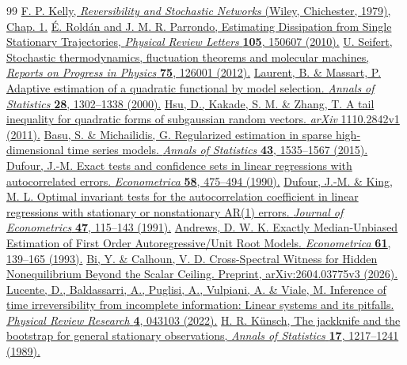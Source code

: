 \begin{thebibliography}{99}
 \href{https://www.statslab.cam.ac.uk/~fpk1/rsn.html}{F. P. Kelly, \emph{Reversibility and Stochastic Networks} (Wiley, Chichester, 1979), Chap. 1.}
 \href{https://doi.org/10.1103/PhysRevLett.105.150607}{\'{E}. Rold\'{a}n and J. M. R. Parrondo, Estimating Dissipation from Single Stationary Trajectories, \emph{Physical Review Letters} \textbf{105}, 150607 (2010).}
 \href{https://doi.org/10.1088/0034-4885/75/12/126001}{U. Seifert, Stochastic thermodynamics, fluctuation theorems and molecular machines, \emph{Reports on Progress in Physics} \textbf{75}, 126001 (2012).}
 \href{https://doi.org/10.1214/aos/1015957395}{Laurent, B. \& Massart, P. Adaptive estimation of a quadratic functional by model selection. \emph{Annals of Statistics} \textbf{28}, 1302--1338 (2000).}
 \href{https://arxiv.org/abs/1110.2842}{Hsu, D., Kakade, S. M. \& Zhang, T. A tail inequality for quadratic forms of subgaussian random vectors. \emph{arXiv} 1110.2842v1 (2011).}
 \href{https://doi.org/10.1214/15-AOS1315}{Basu, S. \& Michailidis, G. Regularized estimation in sparse high-dimensional time series models. \emph{Annals of Statistics} \textbf{43}, 1535--1567 (2015).}
 \href{https://doi.org/10.2307/2938212}{Dufour, J.-M. Exact tests and confidence sets in linear regressions with autocorrelated errors. \emph{Econometrica} \textbf{58}, 475--494 (1990).}
 \href{https://doi.org/10.1016/0304-4076(91)90080-W}{Dufour, J.-M. \& King, M. L. Optimal invariant tests for the autocorrelation coefficient in linear regressions with stationary or nonstationary AR(1) errors. \emph{Journal of Econometrics} \textbf{47}, 115--143 (1991).}
 \href{https://doi.org/10.2307/2951781}{Andrews, D. W. K. Exactly Median-Unbiased Estimation of First Order Autoregressive/Unit Root Models. \emph{Econometrica} \textbf{61}, 139--165 (1993).}
 \href{https://arxiv.org/abs/2604.03775v3}{Bi, Y. \& Calhoun, V. D. Cross-Spectral Witness for Hidden Nonequilibrium Beyond the Scalar Ceiling. Preprint, arXiv:2604.03775v3 (2026).}
 \href{https://doi.org/10.1103/PhysRevResearch.4.043103}{Lucente, D., Baldassarri, A., Puglisi, A., Vulpiani, A. \& Viale, M. Inference of time irreversibility from incomplete information: Linear systems and its pitfalls. \emph{Physical Review Research} \textbf{4}, 043103 (2022).}
 \href{https://doi.org/10.1214/aos/1176347265}{H. R. K\"unsch, The jackknife and the bootstrap for general stationary observations, \emph{Annals of Statistics} \textbf{17}, 1217--1241 (1989).}

\end{thebibliography}

